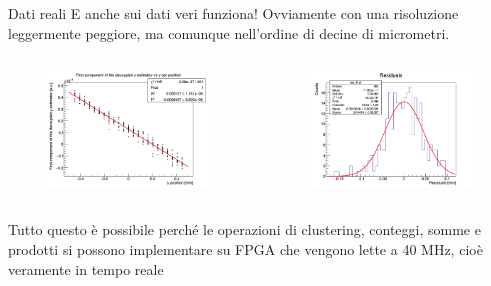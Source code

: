 \documentclass[
10pt,
aspectratio=169,
]{beamer}
\begin{document}
\begin{frame}{Dati reali}
E anche sui dati veri funziona! Ovviamente con una risoluzione leggermente peggiore, ma comunque nell'ordine di decine di micrometri.
        \begin{columns}
        \begin{figure}
            \centering
            \includegraphics[width=\textwidth]{figures/y_fit_dati.png}
        \end{figure}
        \begin{figure}
            \centering
            \includegraphics[width=\textwidth]{figures/y_res_dati.png}
        \end{figure}
    \end{columns}
    Tutto questo è possibile perché le operazioni di clustering, conteggi, somme e prodotti si possono implementare su FPGA che vengono lette a 40 MHz, cioè veramente in tempo reale
\end{frame}
\end{document}
